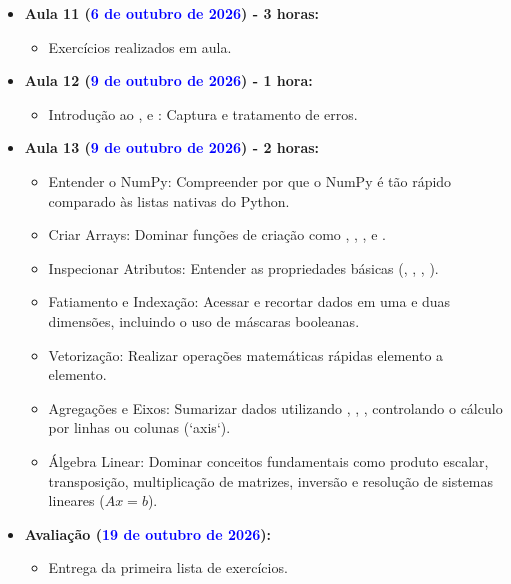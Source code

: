 \begin{itemize}
    \item \textbf{Aula 11 (\textcolor{blue}{6 de outubro de 2026}) - 3 horas:}
    \begin{itemize}\justifying
        \item Exercícios realizados em aula.
    \end{itemize}

    \item \textbf{Aula 12 (\textcolor{blue}{9 de outubro de 2026}) - 1 hora:}
    \begin{itemize}
        \item Introdução ao ,  e : Captura e tratamento de erros.
    \end{itemize}

    \item \textbf{Aula 13 (\textcolor{blue}{9 de outubro de 2026}) - 2 horas:}
    \begin{itemize}
        \item Entender o NumPy: Compreender por que o NumPy é tão rápido comparado às listas nativas do Python.
        \item Criar Arrays: Dominar funções de criação como , , ,  e .
        \item Inspecionar Atributos: Entender as propriedades básicas (, , , ).
        \item Fatiamento e Indexação: Acessar e recortar dados em uma e duas dimensões, incluindo o uso de máscaras booleanas.
        \item Vetorização: Realizar operações matemáticas rápidas elemento a elemento.
        \item Agregações e Eixos: Sumarizar dados utilizando , , , controlando o cálculo por linhas ou colunas (`axis`).
        \item Álgebra Linear: Dominar conceitos fundamentais como produto escalar, transposição, multiplicação de matrizes, inversão e resolução de sistemas lineares ($Ax = b$).

    \end{itemize}


    \item \textbf{Avaliação (\textcolor{blue}{19 de outubro de 2026}):}
    \begin{itemize}\justifying
        \item Entrega da primeira lista de exercícios.
    \end{itemize}


\end{itemize}

